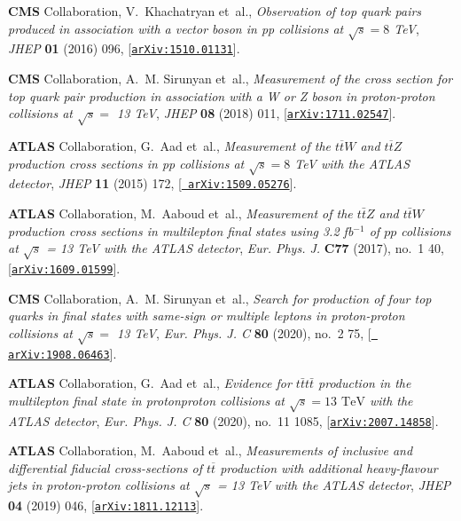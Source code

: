\documentclass[11pt,a4paper]{article}
\numberwithin{equation}{section}
\numberwithin{figure}{section}
\numberwithin{table}{section}
\begin{document}
\begin{thebibliography}{100}
{\bf CMS} Collaboration, V.~Khachatryan et~al., {\it {Observation of top quark
  pairs produced in association with a vector boson in pp collisions at $
  \sqrt{s}=8 $ TeV}},  {\em JHEP} {\bf 01} (2016) 096,
  [\href{http://arxiv.org/abs/1510.01131}{{\tt arXiv:1510.01131}}].

{\bf CMS} Collaboration, A.~M. Sirunyan et~al., {\it {Measurement of the cross
  section for top quark pair production in association with a W or Z boson in
  proton-proton collisions at $\sqrt{s} =$ 13 TeV}},  {\em JHEP} {\bf 08}
  (2018) 011, [\href{http://arxiv.org/abs/1711.02547}{{\tt arXiv:1711.02547}}].

{\bf ATLAS} Collaboration, G.~Aad et~al., {\it {Measurement of the $
  t\overline{t}W $ and $ t\overline{t}Z $ production cross sections in pp
  collisions at $ \sqrt{s}=8 $ TeV with the ATLAS detector}},  {\em JHEP} {\bf
  11} (2015) 172, [\href{http://arxiv.org/abs/1509.05276}{{\tt
  arXiv:1509.05276}}].

{\bf ATLAS} Collaboration, M.~Aaboud et~al., {\it {Measurement of the
  $t\bar{t}Z$ and $t\bar{t}W$ production cross sections in multilepton final
  states using 3.2 fb$^{-1}$ of $pp$ collisions at $\sqrt{s}$ = 13 TeV with the
  ATLAS detector}},  {\em Eur. Phys. J.} {\bf C77} (2017), no.~1 40,
  [\href{http://arxiv.org/abs/1609.01599}{{\tt arXiv:1609.01599}}].

{\bf CMS} Collaboration, A.~M. Sirunyan et~al., {\it {Search for production of
  four top quarks in final states with same-sign or multiple leptons in
  proton-proton collisions at $\sqrt{s}=$ 13 TeV}},  {\em Eur. Phys. J. C} {\bf
  80} (2020), no.~2 75, [\href{http://arxiv.org/abs/1908.06463}{{\tt
  arXiv:1908.06463}}].

{\bf ATLAS} Collaboration, G.~Aad et~al., {\it {Evidence for $t\bar{t}t\bar{t}$
  production in the multilepton final state in proton\textendash{}proton
  collisions at $\sqrt{s}=13$ $\text {TeV}$ with the ATLAS detector}},  {\em
  Eur. Phys. J. C} {\bf 80} (2020), no.~11 1085,
  [\href{http://arxiv.org/abs/2007.14858}{{\tt arXiv:2007.14858}}].

{\bf ATLAS} Collaboration, M.~Aaboud et~al., {\it {Measurements of inclusive
  and differential fiducial cross-sections of $ t\overline{t} $ production with
  additional heavy-flavour jets in proton-proton collisions at $ \sqrt{s} $ =
  13 TeV with the ATLAS detector}},  {\em JHEP} {\bf 04} (2019) 046,
  [\href{http://arxiv.org/abs/1811.12113}{{\tt arXiv:1811.12113}}].


\end{thebibliography}
\end{document}
